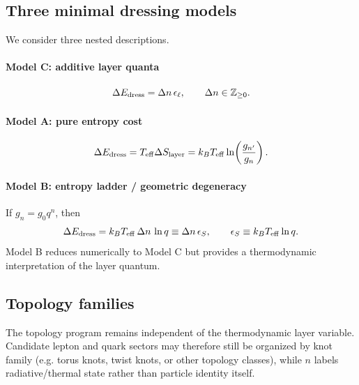 \documentclass[11pt]{article}
\begin{document}
    \subsection{Three minimal dressing models}
        We consider three nested descriptions.
        
        \paragraph{Model C: additive layer quanta}
            \begin{equation}
                \Delta E_{\rm dress} = \Delta n\,\epsilon_\ell,
                \qquad
                \Delta n \in \mathbb{Z}_{\ge 0}.
                \label{eq:dress_additive}
            \end{equation}
        
        \paragraph{Model A: pure entropy cost}
            \begin{equation}
                \Delta E_{\rm dress}
                =
                T_{\rm eff}\Delta S_{\rm layer}
                =
                k_B T_{\rm eff}\ln\!\left(\frac{g_{n'}}{g_n}\right).
                \label{eq:dress_entropy}
            \end{equation}
        
        \paragraph{Model B: entropy ladder / geometric degeneracy}
            If \(g_n=g_0 q^n\), then
            \begin{equation}
                \Delta E_{\rm dress}
                =
                k_B T_{\rm eff}\,\Delta n\,\ln q
                \equiv
                \Delta n\,\epsilon_S,
                \qquad
                \epsilon_S\equiv k_B T_{\rm eff}\ln q.
                \label{eq:dress_entropy_ladder}
            \end{equation}
            Model B reduces numerically to Model C but provides a thermodynamic interpretation of the layer quantum.
    
    \subsection{Topology families}
    The topology program remains independent of the thermodynamic layer variable. Candidate lepton and quark sectors may therefore still be organized by knot family (e.g. torus knots, twist knots, or other topology classes), while \(n\) labels radiative/thermal state rather than particle identity itself.
\end{document}
